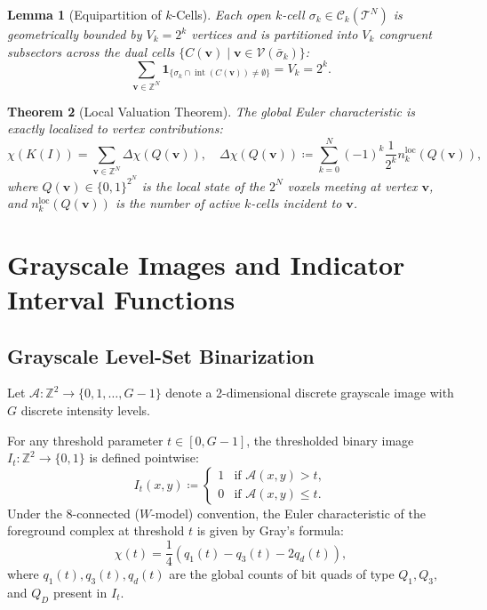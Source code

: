 \documentclass[11pt,a4paper]{article}
\theoremstyle{plain}
\newtheorem{theorem}{Theorem}[section]
\newtheorem{lemma}[theorem]{Lemma}
\theoremstyle{definition}
\theoremstyle{remark}
\newcommand{\Z}{\mathbb{Z}}
\newcommand{\T}{\mathcal{T}}
\newcommand{\V}{\mathcal{V}}
\newcommand{\indicator}{\mathbf{1}}
\begin{document}
\begin{lemma}[Equipartition of $k$-Cells]
\label{lem:equipartition}
Each open $k$-cell $\sigma_k \in \mathcal{C}_k(\T^N)$ is geometrically bounded by $V_k = 2^k$ vertices and is partitioned into $V_k$ congruent subsectors across the dual cells $\{C(\mathbf{v}) \mid \mathbf{v} \in \V(\bar{\sigma}_k)\}$:
\begin{equation}
    \sum_{\mathbf{v} \in \Z^N} \indicator_{\{\sigma_k \cap \operatorname{int}(C(\mathbf{v})) \neq \emptyset\}} = V_k = 2^k.
\end{equation}
\end{lemma}

\begin{theorem}[Local Valuation Theorem]
The global Euler characteristic is exactly localized to vertex contributions:
\begin{equation}
    \chi(K(I)) = \sum_{\mathbf{v} \in \Z^N} \Delta \chi(Q(\mathbf{v})), \quad \Delta \chi(Q(\mathbf{v})) \coloneqq \sum_{k=0}^N (-1)^k \frac{1}{2^k} n_k^{\text{loc}}(Q(\mathbf{v})),
\end{equation}
where $Q(\mathbf{v}) \in \{0, 1\}^{2^N}$ is the local state of the $2^N$ voxels meeting at vertex $\mathbf{v}$, and $n_k^{\text{loc}}(Q(\mathbf{v}))$ is the number of active $k$-cells incident to $\mathbf{v}$.
\end{theorem}

\section{Grayscale Images and Indicator Interval Functions}

\subsection{Grayscale Level-Set Binarization}

Let $\mathcal{A}: \Z^2 \to \{0, 1, \dots, G-1\}$ denote a 2-dimensional discrete grayscale image with $G$ discrete intensity levels. 

For any threshold parameter $t \in [0, G-1]$, the thresholded binary image $I_t: \Z^2 \to \{0, 1\}$ is defined pointwise:
\begin{equation}
    I_t(x, y) \coloneqq \begin{cases} 1 & \text{if } \mathcal{A}(x, y) > t, \\ 0 & \text{if } \mathcal{A}(x, y) \le t. \end{cases}
\end{equation}
Under the 8-connected ($W$-model) convention, the Euler characteristic of the foreground complex at threshold $t$ is given by Gray's formula:
\begin{equation}
\label{eq:euler_W_t}
    \chi(t) = \frac{1}{4} \left( q_1(t) - q_3(t) - 2q_d(t) \right),
\end{equation}
where $q_1(t), q_3(t), q_d(t)$ are the global counts of bit quads of type $Q_1, Q_3,$ and $Q_D$ present in $I_t$.
\end{document}
